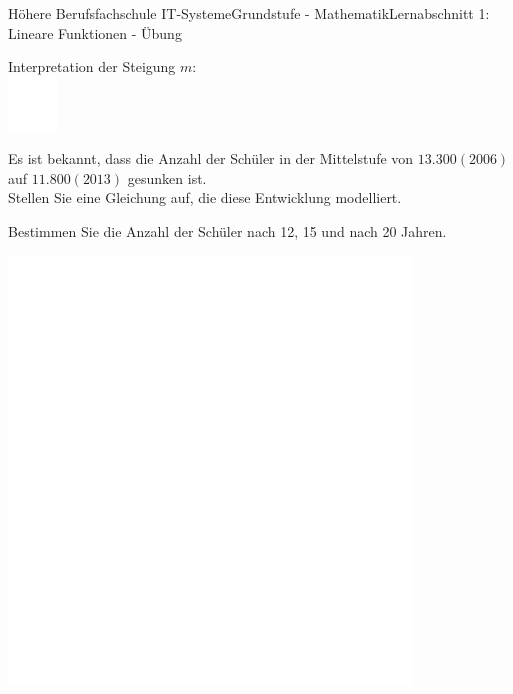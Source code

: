 \documentclass[oneside,openany,headings=optiontotoc,11pt,numbers=noenddot]{scrreprt}
\begin{document}
\begin{worksheet}{Höhere Berufsfachschule IT-Systeme}{Grundstufe - Mathematik}{Lernabschnitt 1: Lineare Funktionen - Übung}
\begin{framed}
		\end{framed}
		\normalsize
		\begin{framed}
			\noindent
			Interpretation der Steigung \(m\):\\
			\includegraphics[width=0.1\textwidth]{../../empty.jpg}\\
		\end{framed}
		\par\bigskip\noindent
		\begin{framed}
			\noindent
			Es ist bekannt, dass die Anzahl der Schüler in der Mittelstufe von \(13.300 (2006)\) auf \(11.800 (2013)\) gesunken ist.\\
			Stellen Sie eine Gleichung auf, die diese Entwicklung modelliert.\\
			\par\noindent
			Bestimmen Sie die Anzahl der Schüler nach 12, 15 und nach 20 Jahren.
		\end{framed}
		\begin{framed}
			\includegraphics[width=0.8\textwidth]{../../empty.jpg}
		\end{framed}
		\newpage
		

\end{worksheet}
\end{document}
